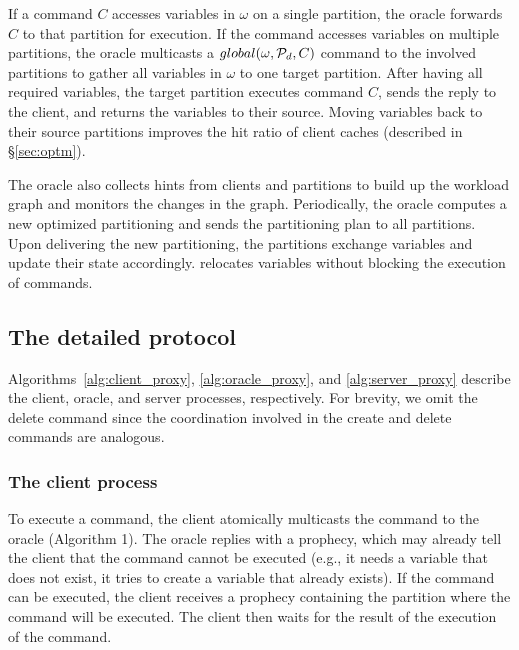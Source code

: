 If a command $C$ accesses variables in $\omega$ on a single partition, 
the oracle forwards $C$ to that partition for execution. If the command 
accesses variables on multiple partitions, the oracle multicasts a 
$global(\omega,\mathcal{P}_d, C)$ command to the involved partitions to gather 
all variables in $\omega$ to one target partition. After having all 
required variables, the target partition executes command $C$, 
sends the reply to the client, and returns the variables to their source. 
Moving variables back to their source partitions improves the hit ratio of client caches (described in \S\ref{sec:optm}).

The oracle also collects hints from clients and partitions to 
build up the workload graph and monitors the changes in the graph. 
Periodically, the oracle computes a new optimized partitioning and sends the 
partitioning plan to all partitions. Upon delivering the new partitioning, 
the partitions exchange variables and update their state accordingly.
\dynastar relocates variables without blocking the execution of commands.

\subsection{The detailed protocol}
\label{sec:detailed}

Algorithms~\ref{alg:client_proxy}, \ref{alg:oracle_proxy}, and \ref{alg:server_proxy} describe the client, oracle, and server processes, respectively. 
For brevity, we omit the delete command since the coordination involved in the create and delete commands are analogous. 


\subsubsection{The client process} 

To execute a command, the client atomically multicasts the command to the oracle (Algorithm 1).
The oracle replies with a prophecy, which may already tell the client that the command cannot be executed (e.g., it needs a variable that does not exist, it tries to create a variable that already exists).
If the command can be executed, the client receives a prophecy containing the partition where the command will be executed. The client then waits for the result of the execution of the command.




